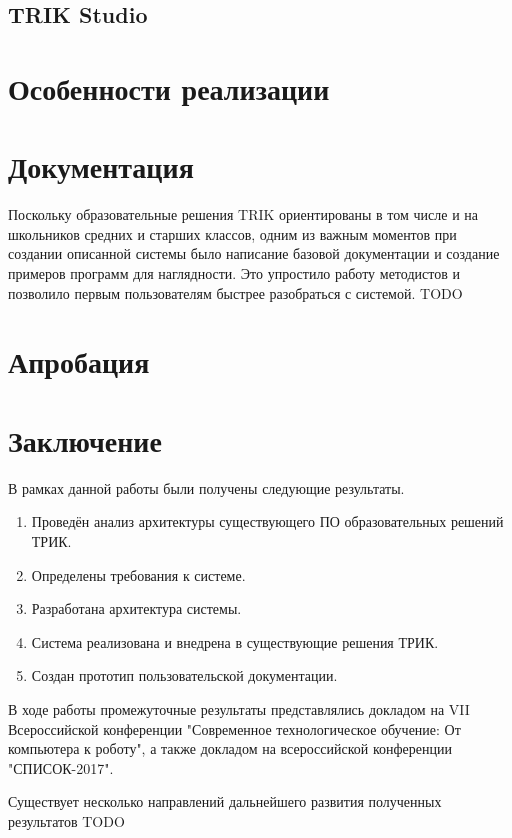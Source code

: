 \documentclass[14pt]{matmex-diploma-custom}
\begin{document}
\subsection{TRIK Studio}

\section{Особенности реализации}

\section{Документация}
Поскольку образовательные решения TRIK ориентированы в том числе и на школьников средних и старших классов, одним из важным моментов при создании описанной системы было написание базовой документации и создание примеров программ для наглядности. Это упростило работу методистов и позволило первым пользователям быстрее разобраться с системой. TODO

\section{Апробация}


\section*{Заключение}

В рамках данной работы были получены следующие результаты.
\begin{enumerate}
\item Проведён анализ архитектуры существующего ПО образовательных решений ТРИК.
\item Определены требования к системе.
\item Разработана архитектура системы.
\item Система реализована и внедрена в существующие решения ТРИК.
\item Создан прототип пользовательской документации.
\end{enumerate}


В ходе работы промежуточные результаты представлялись докладом на VII Всероссийской конференции "Современное технологическое обучение: От компьютера к роботу", а также докладом на всероссийской конференции "СПИСОК-2017".

Существует несколько направлений дальнейшего развития полученных результатов TODO

\setmonofont[Mapping=tex-text]{CMU Typewriter Text}


\end{document}
